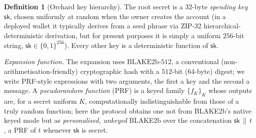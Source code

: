 \documentclass[11pt,a4paper]{article}
\theoremstyle{definition}
\newtheorem{definition}[theorem]{Definition}
\begin{document}
\begin{definition}[Orchard key hierarchy]\label{def:keys}
The root secret is a $32$-byte \emph{spending key} $\mathsf{sk}$, chosen
uniformly at random when the owner creates the account (in a deployed wallet
it typically derives from a seed phrase via ZIP-32 hierarchical-deterministic
derivation, but for present purposes it is simply a uniform $256$-bit string,
$\mathsf{sk} \in \{0,1\}^{256}$).
Every other key is a deterministic function of $\mathsf{sk}$.

\emph{Expansion function.} The expansion uses
$\mathrm{BLAKE2b\text{-}512}$, a conventional (non-arithmetisation-friendly)
cryptographic hash with a $512$-bit ($64$-byte) digest; we write PRF-style
expressions with two arguments, the first a key and the second a message. A
\emph{pseudorandom function} (PRF) is a keyed family $\{f_K\}_K$ whose
outputs are, for a secret uniform $K$, computationally indistinguishable
from those of a truly random function; here the protocol obtains one not from
BLAKE2b's native keyed mode but as \emph{personalised, unkeyed} BLAKE2b over
the concatenation $\mathsf{sk} \,\|\, t$, a PRF of $t$ whenever
$\mathsf{sk}$ is secret.


\end{definition}
\end{document}
